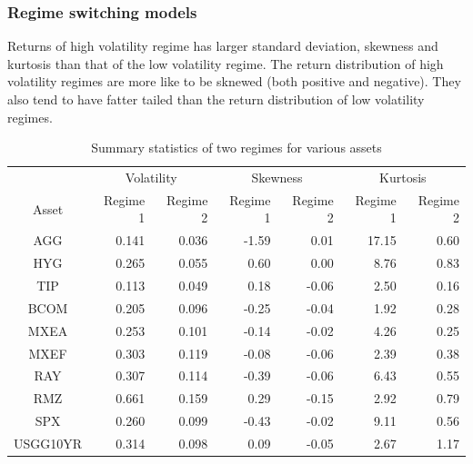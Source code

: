 \documentclass{beamer}
\newcommand\Fontviii{\fontsize{8}{9.2}\selectfont}
\begin{document}
\begin{frame}
\frametitle{Regime switching models}
\Fontviii

Returns of high volatility regime has larger standard deviation, skewness and kurtosis than that of the low volatility regime. The return distribution of high volatility regimes are more like to be sknewed (both positive and negative). They also tend to have fatter tailed than the return distribution of low volatility regimes.

\begin{table}[!h]
\centering 
\begin{tabular}{ | c || rr | rr | rr | } 
 \hline
& \multicolumn{2}{c|}{Volatility} & \multicolumn{2}{c|}{Skewness} & \multicolumn{2}{c|}{Kurtosis} \\
Asset & Regime 1 & Regime 2 & Regime 1 & Regime 2 & Regime 1 & Regime 2 \\
  \hline \hline
AGG & 0.141 & 0.036 & -1.59 &  0.01 & 17.15 &  0.60\\ 
HYG & 0.265 & 0.055 &  0.60 &  0.00 &  8.76 &  0.83\\ 
TIP & 0.113 & 0.049 &  0.18 & -0.06 &  2.50 &  0.16\\ 
BCOM & 0.205 & 0.096 & -0.25 & -0.04 &  1.92 &  0.28\\ 
MXEA & 0.253 & 0.101 & -0.14 & -0.02 &  4.26 &  0.25\\ 
MXEF & 0.303 & 0.119 & -0.08 & -0.06 &  2.39 &  0.38\\ 
RAY & 0.307 & 0.114 & -0.39 & -0.06 &  6.43 &  0.55\\ 
RMZ & 0.661 & 0.159 &  0.29 & -0.15 &  2.92 &  0.79\\ 
SPX & 0.260 & 0.099 & -0.43 & -0.02 &  9.11 &  0.56\\ 
USGG10YR & 0.314 & 0.098 &  0.09 & -0.05 &  2.67 &  1.17 \\
 \hline
\end{tabular}
\label{table:statSumRegime}
\caption{Summary statistics of two regimes for various assets} 
\end{table}
\end{frame}

\end{document}
